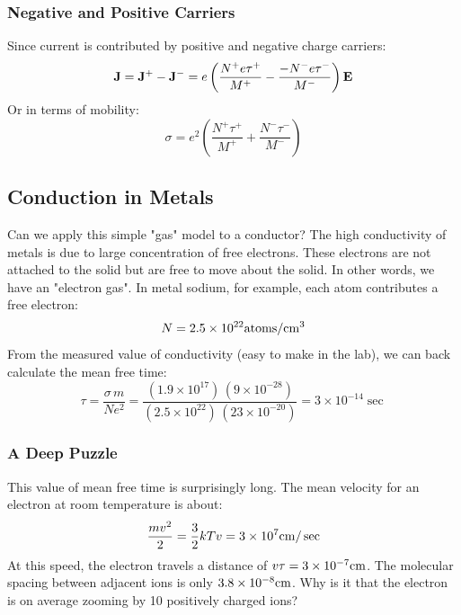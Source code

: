 \subsubsection{Negative and Positive Carriers}

 Since current is contributed by positive and negative charge carriers:
\begin{equation}
	{\bf{J}} = {{\bf{J}}^ + } - {{\bf{J}}^ - } = e\left( {\frac{{{N^ + }e{\tau ^ + }}}{{{M^ + }}} - \frac{{ - {N^ - }e{\tau ^ - }}}{{{M^ - }}}} \right){\bf{E}}
\end{equation}
Or in terms of mobility:
\begin{equation}
	\sigma  = {e^2}\left( {\frac{{{N^ + }{\tau ^ + }}}{{{M^ + }}} + \frac{{{N^ - }{\tau ^ - }}}{{{M^ - }}}} \right)
\end{equation}

 


\subsection{Conduction in Metals}


Can we apply this simple "gas" model to a conductor?  The  high conductivity of metals is due to large concentration of free electrons.   These electrons are not attached to the solid but are free to move about the solid.  In other words, we have an "electron gas".   In metal sodium, for example,  each atom contributes a free electron:  
\[ 
	N = 2.5 \times {10^{22}}{\rm{atoms/c}}{{\rm{m}}^{\rm{3}}}
\]
From the measured value of conductivity (easy to make in the lab), we can back calculate the mean free time:
\begin{equation}\tau  = \frac{{\sigma \,m}}{{N{e^2}}} = \frac{{\left( {1.9 \times {{10}^{17}}} \right)\,\left( {9 \times {{10}^{ - 28}}} \right)}}{{\left( {2.5 \times {{10}^{22}}} \right)\,\left( {23 \times {{10}^{ - 20}}} \right)}} = 3 \times {10^{ - 14}}\sec 
\end{equation}

 
\subsubsection{A Deep Puzzle}

This value of mean free time is surprisingly long.  The mean velocity for an electron at room temperature is about:  
\begin{equation} 
	\frac{{m{v^2}}}{2} = \frac{3}{2}kT  v = 3 \times {10^7}{\rm{cm}}/\sec 
\end{equation}
At this speed, the electron travels a distance of $v\tau  = 3 \times {10^{ - 7}}{\rm{cm}}$.  The molecular spacing between adjacent ions is only $3.8 \times {10^{ - 8}}{\rm{cm}}$.  Why is it that the electron is on average zooming by 10 positively charged ions?
 

